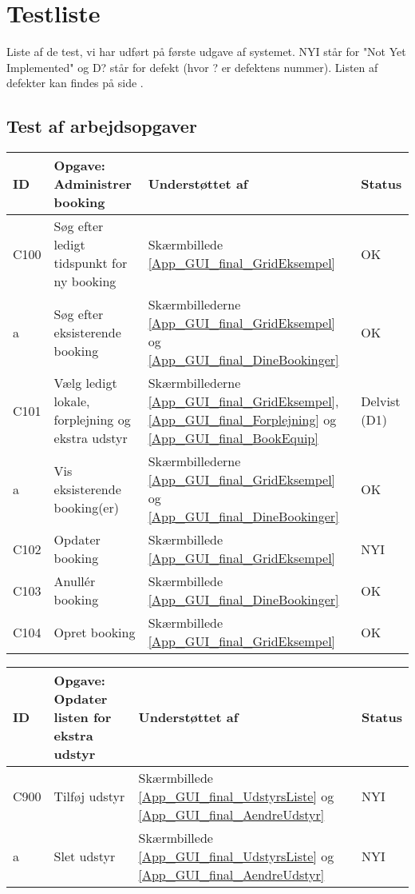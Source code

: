 \section{Testliste}
\label{App_Test_ListOfTest}
Liste af de test, vi har udført på første udgave af systemet. NYI står for "Not Yet Implemented" og D? står for defekt (hvor ? er defektens nummer). Listen af defekter kan findes på side \pageref{App_Test_Defects}.
\subsection{Test af arbejdsopgaver}
\label{App_Test_ListOfTest_Work}

\begin{tabular}{ |p{0.85cm}| p{7.1cm} | p{5.5cm} | p{2cm} | }
\hline
\textbf{ID} & \textbf{Opgave: Administrer booking} & \textbf{Understøttet af} & \textbf{Status}\\ 
\hline
C100 & Søg efter ledigt tidspunkt for ny booking & Skærmbillede \ref{App_GUI_final_GridEksempel} & OK \\
\hline
a & Søg efter eksisterende booking & Skærmbillederne \ref{App_GUI_final_GridEksempel}  og \ref{App_GUI_final_DineBookinger} & OK \\
\hline
C101 & Vælg ledigt lokale, forplejning og ekstra udstyr & Skærmbillederne \ref{App_GUI_final_GridEksempel}, \ref{App_GUI_final_Forplejning} og \ref{App_GUI_final_BookEquip}  & Delvist (D1) \\
\hline
a & Vis eksisterende booking(er) & Skærmbillederne \ref{App_GUI_final_GridEksempel} og \ref{App_GUI_final_DineBookinger} & OK \\
\hline
C102 & Opdater booking & Skærmbillede \ref{App_GUI_final_GridEksempel} & NYI \\
\hline
C103 & Anullér booking & Skærmbillede \ref{App_GUI_final_DineBookinger} & OK \\
\hline
C104 & Opret booking & Skærmbillede \ref{App_GUI_final_GridEksempel} & OK \\
\hline
\end{tabular}

\begin{tabular}{ |p{0.85cm}| p{7.1cm} | p{5.5cm} | p{2cm} | }
\hline
\textbf{ID} & \textbf{Opgave: Opdater listen for ekstra udstyr} & \textbf{Understøttet af} &\textbf{Status}\\ 
\hline
C900 & Tilføj udstyr & Skærmbillede \ref{App_GUI_final_UdstyrsListe} og \ref{App_GUI_final_AendreUdstyr} & NYI \\
\hline
a & Slet udstyr & Skærmbillede \ref{App_GUI_final_UdstyrsListe} og \ref{App_GUI_final_AendreUdstyr} & NYI \\
\hline
\end{tabular}

